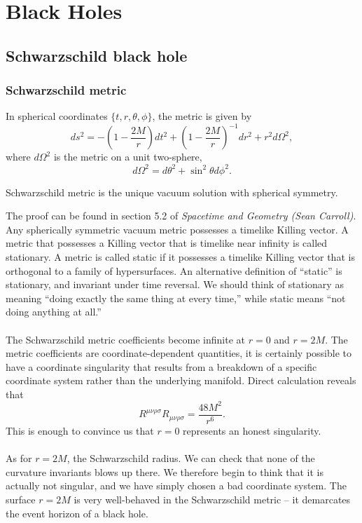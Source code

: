 \chapter{Black Holes}
\section{Schwarzschild black hole}
\subsection{Schwarzschild metric}
In spherical coordinates $\{t,r,\theta,\phi\}$, the metric is given by
\[ds^2 = -\left(1 - \frac{2M}{r} \right)dt^2 + \left(1 - \frac{2M}{r} \right)^{-1}dr^2 + r^2 d\Omega^2,\]
where $d\Omega^2$ is the metric on a unit two-sphere,
\[d\Omega^2 = d\theta^2 + \sin^2\theta d\phi^2.\]

\begin{newthem}
Schwarzschild metric is the unique vacuum solution with spherical symmetry.
\end{newthem}
\noindent
The proof can be found in section 5.2 of \emph{Spacetime and Geometry (Sean Carroll)}. 
Any spherically symmetric vacuum metric possesses a timelike Killing vector. A metric that possesses a Killing vector that is timelike near infinity is called stationary. A metric is called static if it possesses a timelike Killing vector that is orthogonal to a family of hypersurfaces. 
An alternative definition of ``static'' is stationary, and invariant under time reversal. We should think of stationary as meaning ``doing exactly the same thing at every time,'' while static means ``not doing anything at all.''
\\ \\
The Schwarzschild metric coefficients become infinite at $r = 0$ and $r = 2M$. 
The metric coefficients are coordinate-dependent quantities, it is certainly possible to have a coordinate singularity that results from a breakdown of a specific coordinate system rather than the underlying manifold. 
Direct calculation reveals that
\[R^{\mu\nu\rho\sigma}R_{\mu\nu\rho\sigma} = \frac{48M^2}{r^6}.\]
This is enough to convince us that $r = 0$ represents an honest singularity.
\\ \\
As for $r = 2M$, the Schwarzschild radius. We can check that none of the curvature invariants blows up there. We therefore begin to think that it is actually not singular, and we have simply chosen a bad coordinate system. The surface $r = 2M$ is very well-behaved in the Schwarzschild metric -- it demarcates the event horizon of a black hole.

